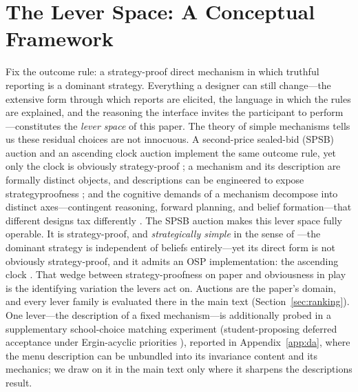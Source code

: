 
\section{The Lever Space: A Conceptual Framework}\label{sec:framework}

Fix the outcome rule: a strategy-proof direct mechanism in which truthful
reporting is a dominant strategy. Everything a designer can still change---the
extensive form through which reports are elicited, the language in which the
rules are explained, and the reasoning the interface invites the participant to
perform---constitutes the \emph{lever space} of this paper. The theory of simple
mechanisms tells us these residual choices are not innocuous. A second-price
sealed-bid (SPSB) auction and an ascending clock auction implement the same
outcome rule, yet only the clock is obviously strategy-proof
\citep{li2017obviously}; a mechanism and its description are formally distinct
objects, and descriptions can be engineered to expose strategyproofness
\citep{gonczarowski2023strategyproofness}; and the cognitive demands of a
mechanism decompose into distinct axes---contingent reasoning, forward
planning, and belief formation---that different designs tax differently
\citep{li2024designing}. The SPSB auction makes this lever space
fully operable. It is strategy-proof, and \emph{strategically simple} in the sense
of \citet{borgers2019strategically}---the dominant strategy is independent of
beliefs entirely---yet its direct form is not obviously strategy-proof, and it
admits an OSP implementation: the ascending clock
\citep{li2017obviously}. That wedge between strategy-proofness on paper and
obviousness in play is the identifying variation the levers act on. Auctions are
the paper's domain, and every lever family is evaluated there in the main text
(Section~\ref{sec:ranking}). One lever---the description of a fixed
mechanism---is additionally probed in a supplementary school-choice matching
experiment (student-proposing deferred acceptance under Ergin-acyclic
priorities \citep{ergin2002efficient,ashlagi2018stable}), reported in
Appendix~\ref{app:da}, where the menu description can be unbundled into its
invariance content and its mechanics; we draw on it in the main text only where
it sharpens the descriptions result.


